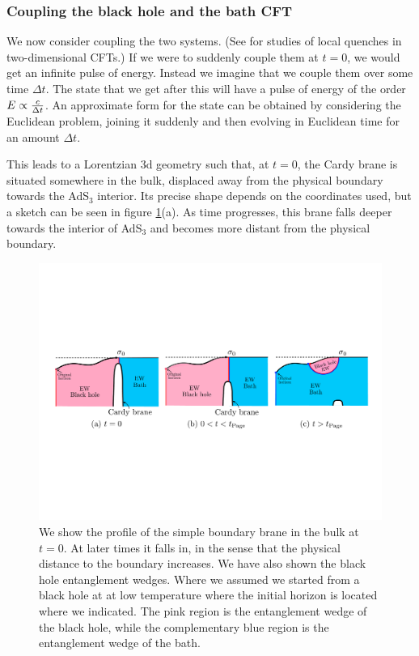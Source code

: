 \documentclass[11pt]{article}
\begin{document}
\subsubsection{Coupling the black hole and the bath CFT} 
 
We now consider coupling the two systems.
(See \cite{Anous:2016kss, Calabrese:2007mtj, Calabrese:2009qy, Asplund:2013zba, Caputa:2019avh, Shimaji:2018czt} for studies of local quenches in two-dimensional CFTs.)
If we were to suddenly couple them at $t=0$, we would get an infinite pulse of energy.
Instead we imagine that we couple them over some time $\Delta t$. 
The state that we get after this will have a pulse of energy of the order $E \propto { c \over \Delta t}$. 
An approximate form for the state can be obtained by considering the Euclidean problem, joining it suddenly and then evolving in Euclidean time for an amount $\Delta t$. 

This leads to a Lorentzian 3d geometry such that, at $t=0$, the Cardy brane is situated somewhere in the bulk, displaced away from the physical boundary towards the AdS$_3$ interior. 
Its precise shape depends on the coordinates used, but a sketch can be seen in figure \ref{EarlyEW}(a). 
As time progresses, this brane falls deeper towards the interior of  AdS$_3$ and becomes more distant from the physical boundary.

\begin{figure}[ht]
    \begin{center}
    \includegraphics[scale=.48]{Figures/EarlyEW}
    \end{center}
    \caption{We show the profile of the simple boundary brane in the bulk at $t=0$. 
    At later times it falls in, in the sense that the physical distance to the boundary increases. 
    We have also shown the black hole entanglement wedges. 
    Where we assumed we started from a black hole at at low temperature where the initial horizon is located where we indicated. The pink region is the entanglement wedge of the black hole, while the complementary blue region is the entanglement wedge of the bath.}
    \label{EarlyEW}
\end{figure}
\end{document}
